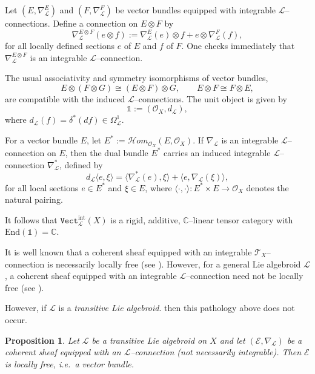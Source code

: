 \documentclass[12pt,reqno]{amsart}
\numberwithin{equation}{subsection}
\newtheorem{proposition}[equation]{Proposition}
\theoremstyle{definition}
\theoremstyle{theorem}
\begin{document}
Let $(E,\nabla^{E}_{\mathcal{L}})$ and $(F,\nabla^{F}_{\mathcal{L}})$ be vector
bundles equipped with integrable $\mathcal{L}$--connections. Define a
connection on $E\otimes F$ by
\[
\nabla^{E\otimes F}_{\mathcal{L}}(e\otimes f)
:= \nabla^{E}_{\mathcal{L}}(e)\otimes f
+ e\otimes \nabla^{F}_{\mathcal{L}}(f),
\]
for all locally defined sections $e$ of $E$ and $f$ of $F$. One checks
immediately that $\nabla^{E\otimes F}_{\mathcal{L}}$ is an integrable
$\mathcal{L}$--connection.

The usual associativity and symmetry isomorphisms of vector bundles,
\[
E\otimes(F\otimes G)\cong (E\otimes F)\otimes G,
\qquad
E\otimes F \cong F\otimes E,
\]
are compatible with the induced $\mathcal{L}$--connections. The unit object
is given by
\[
\mathbb{1} := (\mathcal{O}_{X}, d_{\mathcal{L}}),
\]
where $d_{\mathcal{L}}(f)=\delta^{*}(df)\in \Omega^{1}_{\mathcal{L}}$.

For a vector bundle $E$, let $E^{*}:=\mathcal{H}om_{\mathcal{O}_{X}}(E,\mathcal{O}_{X})$.
If $\nabla_{\mathcal{L}}$ is an integrable $\mathcal{L}$--connection on $E$,
then the dual bundle $E^{*}$ carries an induced integrable
$\mathcal{L}$--connection $\nabla^{*}_{\mathcal{L}}$, defined by
\[
d_{\mathcal{L}}\langle e,\xi\rangle
= \langle\nabla^{*}_{\mathcal{L}}(e),\xi\rangle
+ \langle e,\nabla_{\mathcal{L}}(\xi)\rangle,
\]
for all local sections $e\in E^{*}$ and $\xi\in E$, where
$\langle\cdot,\cdot\rangle : E^{*}\times E\to \mathcal{O}_{X}$ denotes the
natural pairing.

It follows that $\texttt{Vect}^{\text{int}}_{\mathcal{L}}(X)$ is a rigid, additive,
$\mathbb{C}$--linear tensor category with
$\mathrm{End}(\mathbb{1})=\mathbb{C}$.


It is well known that a coherent sheaf equipped with an integrable
$\mathcal{T}_{X}$--connection is necessarily locally free (see
\cite[\S\,VI, Proposition~1.7]{A.Borel-1987}). However, for a general Lie
algebroid $\mathcal{L}$, a coherent sheaf equipped with an integrable
$\mathcal{L}$--connection need not be locally free (see
\cite[\S\,2.2, Example~2.12]{GLP-2018}).

 However, if  $\mathcal{L}$ is a \emph{transitive Lie algebroid}. then this pathology above does not occur.

\begin{proposition}\label{def:locally free L-modulues}
	\cite[\S\,2.2, Proposition~2.15]{GLP-2018}
	Let $\mathcal{L}$ be a transitive Lie algebroid on $X$ and let
	$(\mathcal{E},\nabla_{\mathcal{L}})$ be a coherent sheaf equipped with an
	$\mathcal{L}$--connection (not necessarily integrable). Then $\mathcal{E}$ is
	locally free, i.e.\ a vector bundle.
\end{proposition}
\end{document}
